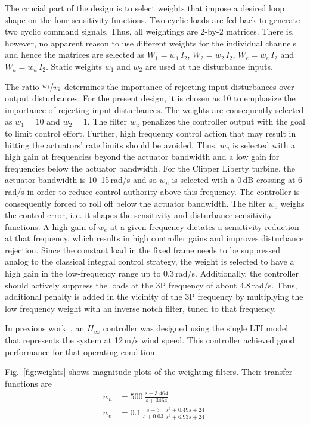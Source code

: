 \documentclass[times]{weauth}
\begin{document}
The crucial part of the design is to select weights that impose a desired loop shape on the four sensitivity functions. 
Two cyclic loads are fed back to generate two cyclic command signals. Thus, all weightings are 2-by-2 matrices. There is, however, no apparent reason to use different weights for the individual channels and hence the matrices are selected as $W_1 = w_1\,I_2$, $W_2 = w_2 \,I_2$, $W_e = w_e\,I_2$ and $W_u = w_u\,I_2$. Static weights $w_1$ and $w_2$ are used at the disturbance inputs. 

The ratio $\sfrac{w_1}{w_2}$ determines the importance of rejecting input disturbances over output disturbances. For the present design, it is chosen as 10 to emphasize the importance of rejecting input disturbances. The weights are consequently selected as $w_1 = 10$ and $w_2 = 1$.
%
The filter $w_u$ penalizes the controller output with the goal to limit control effort. Further, high frequency control action that may result in hitting the actuators' rate limits should be avoided. 
Thus, $w_u$ is selected with a high gain at frequencies beyond the actuator bandwidth and a low gain for frequencies below the actuator bandwidth. 
For the Clipper Liberty turbine, the actuator bandwidth is 10--15\,rad/s and so $w_u$ is selected with a 0\,dB crossing at 6\,rad/s in order to reduce control authority above this frequency.
The controller is consequently forced to roll off below the actuator bandwidth. 
The filter $w_e$ weighs the control error, i.\,e. it shapes the sensitivity and disturbance sensitivity functions. 
A high gain of $w_e$ at a given frequency dictates a sensitivity reduction at that frequency, which results in high controller gains and improves disturbance rejection.
%
Since the constant load in the fixed frame needs to be suppressed analog to the classical integral control strategy, the weight is selected to have a high gain in the low-frequency range up to 0.3\,rad/s. Additionally, the controller should actively suppress the loads at the 3P frequency of  about 4.8\,rad$/$s. Thus, additional penalty is added in the vicinity of the 3P frequency by multiplying the low frequency weight with an inverse notch filter, tuned to that frequency. 

In previous work~\cite{OssmannEtAl_16DSCC_Load}, an $H_\infty$ controller was designed using the single LTI model that represents the system at 12\,m/s wind speed. This controller achieved good performance for that operating condition 

Fig.~\ref{fig:weights} shows magnitude plots of the weighting filters.
Their transfer functions are
\begin{equation}
	\begin{split}
		w_u &= 500 \,\frac{s + 3.464}{s + 3464}\\
		w_e &= 0.1 \, \frac{s + 3}{s + 0.03} \, \frac{s^2 + 0.49s + 24}{s^2 + 6.93s + 24}.
	\end{split}
\end{equation}
\end{document}
